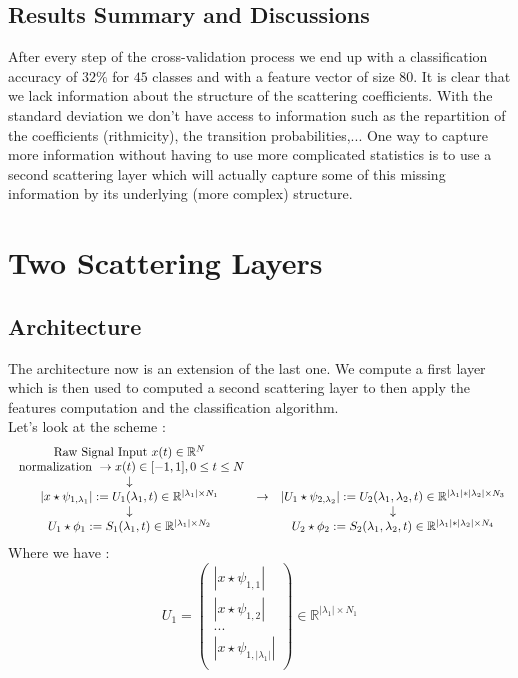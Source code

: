 \documentclass[a4paper]{report}
\begin{document}
\subsection{Results Summary and Discussions}
After every step of the cross-validation process we  end up with a classification accuracy of $32\%$ for $45$ classes and with a feature vector of size $80$. It is clear that we lack information about the structure of the scattering coefficients. With the standard deviation we don't have access to information such as the repartition of the coefficients (rithmicity), the transition probabilities,...
One way to capture more information without having to use more complicated statistics is to use a second scattering layer which will actually capture some of this missing information by its underlying (more complex) structure.
\section{Two Scattering Layers}
\subsection{Architecture}
The architecture now is an extension of the last one. We compute a first layer which is then used to computed a second scattering layer to then apply the features computation and the classification algorithm.\\
Let's look at the scheme : 
\begin{equation}
\begin{array}{c c c}
\text{Raw Signal Input } x(t)\in \mathbb{R}^N & & \\
\text{ normalization } \rightarrow x(t) \in  [-1,1], 0\leq t\leq N & & \\
\downarrow & &\\
 | x \star \psi_{1,\lambda_1}  |:= U_1(\lambda_1,t) \in \mathbb{R}^{|\lambda_1| \times N_1} & \rightarrow & |U_1 \star \psi _{2,\lambda_2}| := U_2(\lambda_1,\lambda_2,t) \in \mathbb{R}^{|\lambda_1|*|\lambda_2| \times N_3} \\
\downarrow & & \downarrow \\
U_1 \star \phi_1 := S_1(\lambda_1,t)\in \mathbb{R}^{|\lambda_1| \times N_2} & &U_2 \star \phi_2 := S_2(\lambda_1,\lambda_2,t)\in \mathbb{R}^{|\lambda_1|*|\lambda_2| \times N_4} 
\end{array}
\end{equation}
Where we have :\\ 
\[
U_1=\left( \begin{matrix}
|x\star \psi_{1,1} | \\
|x\star \psi_{1,2} | \\
... \\
|x\star \psi_{1,|\lambda_1|} |\\
\end{matrix}
\right)
\in \mathbb{R}^{|\lambda_1|\times N_1}
\]
\end{document}
